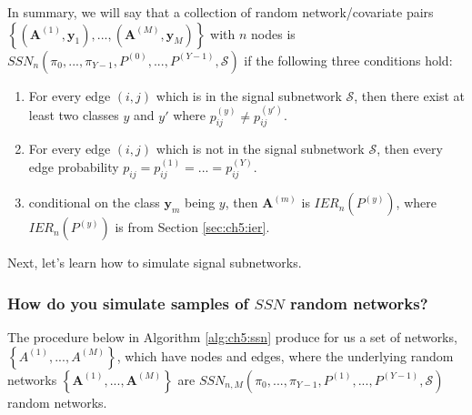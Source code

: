 In summary, we will say that a collection of random network/covariate pairs $\left\{(\mathbf A^{(1)}, \mathbf y_1), ..., (\mathbf A^{(M)}, \mathbf y_M)\right\}$ with $n$ nodes is $SSN_n(\pi_0, ..., \pi_{Y-1}, P^{(0)}, ..., P^{(Y-1)}, \mathcal S)$ if the following three conditions hold:
\begin{enumerate}
    \item For every edge $(i, j)$ which is in the signal subnetwork $\mathcal S$, then there exist at least two classes $y$ and $y'$ where $p_{ij}^{(y)} \neq p_{ij}^{(y')}$.
    \item For every edge $(i, j)$ which is not in the signal subnetwork $\mathcal S$, then every edge probability $p_{ij}=p_{ij}^{(1)} =...= p_{ij}^{(Y)}$. 
    \item conditional on the class $\mathbf y_m$ being $y$, then $\mathbf A^{(m)}$ is $IER_n(P^{(y)})$, where $IER_n(P^{(y)})$ is from Section \ref{sec:ch5:ier}.
\end{enumerate}

Next, let's learn how to simulate signal subnetworks.

\subsubsection*{How do you simulate samples of $SSN$ random networks?}

The procedure below in Algorithm \ref{alg:ch5:ssn} produce for us a set of networks, $\left\{A^{(1)}, ..., A^{(M)}\right\}$, which have nodes and edges, where the underlying random networks $\left\{\mathbf A^{(1)},..., \mathbf A^{(M)}\right\}$ are $SSN_{n,M}(\pi_0, ..., \pi_{Y-1}, P^{(1)}, ..., P^{(Y-1)}, \mathcal S)$ random networks.


